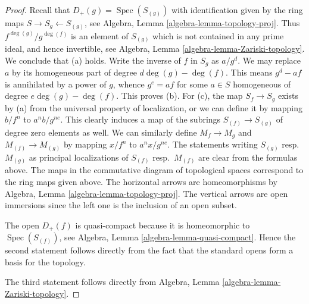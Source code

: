 \documentclass{stacks-project}
\theoremstyle{plain}
\theoremstyle{definition}
\theoremstyle{remark}
\numberwithin{equation}{subsection}
\def\Spec{\mathop{\mathrm{Spec}}}
\begin{document}
\begin{proof}
Recall that $D_{+}(g) = \Spec(S_{(g)})$ with identification
given by the ring maps $S \to S_g \leftarrow S_{(g)}$, see
Algebra, Lemma \ref{algebra-lemma-topology-proj}.
Thus $f^{\deg(g)}/g^{\deg(f)}$ is an element of $S_{(g)}$ which is not
contained in any prime ideal, and hence invertible,
see Algebra, Lemma \ref{algebra-lemma-Zariski-topology}.
We conclude that (a) holds.
Write the inverse of $f$ in $S_g$ as $a/g^d$.
We may replace $a$ by its homogeneous part of degree $d\deg(g) - \deg(f)$.
This means $g^d - af$ is annihilated by a power of $g$, whence
$g^e = af$ for some $a \in S$ homogeneous of degree $e\deg(g) - \deg(f)$.
This proves (b).
For (c), the map $S_f \to S_g$ exists by (a) from the universal property
of localization, or we can define it by mapping $b/f^n$
to $a^nb/g^{ne}$. This clearly induces a map of the subrings
$S_{(f)} \to S_{(g)}$ of degree zero elements as well.
We can similarly define $M_f \to M_g$ and $M_{(f)} \to M_{(g)}$ by mapping
$x/f^n$ to $a^nx/g^{ne}$. The statements writing $S_{(g)}$
resp.\ $M_{(g)}$ as principal localizations of $S_{(f)}$ resp.\ $M_{(f)}$
are clear from the formulas above. The maps in the commutative diagram
of topological spaces correspond to the ring maps given above. The
horizontal arrows are homeomorphisms by
Algebra, Lemma \ref{algebra-lemma-topology-proj}.
The vertical arrows are open immersions since the left
one is the inclusion of an open subset.

\medskip\noindent
The open $D_{+}(f)$ is quasi-compact because it is homeomorphic
to $\Spec(S_{(f)})$, see  Algebra, Lemma \ref{algebra-lemma-quasi-compact}.
Hence the second statement follows directly
from the fact that the standard opens form
a basis for the topology.

\medskip\noindent
The third statement follows directly from
Algebra, Lemma \ref{algebra-lemma-Zariski-topology}.
\end{proof}
\end{document}
